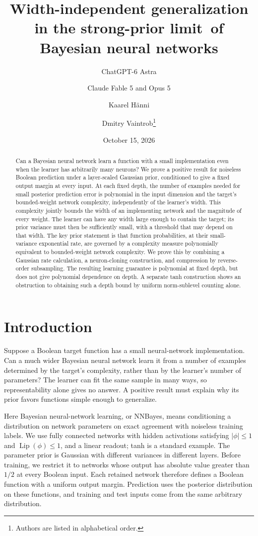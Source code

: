 \documentclass[11pt]{article}
\title{Width-independent generalization in the strong-prior limit\ of Bayesian neural networks}
\author{ChatGPT-6 Astra \and Claude Fable 5 and Opus 5 \and Kaarel H\"anni \and Dmitry Vaintrob\thanks{Authors are listed in alphabetical order.}}
\date{October 15, 2026}
\theoremstyle{definition}
\DeclareMathOperator{\Lip}{Lip}
\begin{document}
\maketitle
\begin{abstract}
Can a Bayesian neural network learn a function with a small implementation even when the learner has arbitrarily many neurons? We prove a positive result for noiseless Boolean prediction under a layer-scaled Gaussian prior, conditioned to give a fixed output margin at every input. At each fixed depth, the number of examples needed for small posterior prediction error is polynomial in the input dimension and the target's bounded-weight network complexity, independently of the learner's width. This complexity jointly bounds the width of an implementing network and the magnitude of every weight. The learner can have any width large enough to contain the target; its prior variance must then be sufficiently small, with a threshold that may depend on that width. The key prior statement is that function probabilities, at their small-variance exponential rate, are governed by a complexity measure polynomially equivalent to bounded-weight network complexity. We prove this by combining a Gaussian rate calculation, a neuron-cloning construction, and compression by reverse-order subsampling. The resulting learning guarantee is polynomial at fixed depth, but does not give polynomial dependence on depth. A separate tanh construction shows an obstruction to obtaining such a depth bound by uniform norm-sublevel counting alone.
\end{abstract}

\section{Introduction}
Suppose a Boolean target function has a small neural-network implementation. Can a much wider Bayesian neural network learn it from a number of examples determined by the target's complexity, rather than by the learner's number of parameters? The learner can fit the same sample in many ways, so representability alone gives no answer. A positive result must explain why its prior favors functions simple enough to generalize.

Here Bayesian neural-network learning, or NNBayes, means conditioning a distribution on network parameters on exact agreement with noiseless training labels. We use fully connected networks with hidden activations satisfying $|\phi|\leq1$ and $\Lip(\phi)\leq1$, and a linear readout; tanh is a standard example. The parameter prior is Gaussian with different variances in different layers. Before training, we restrict it to networks whose output has absolute value greater than $1/2$ at every Boolean input. Each retained network therefore defines a Boolean function with a uniform output margin. Prediction uses the posterior distribution on these functions, and training and test inputs come from the same arbitrary distribution.
\end{document}
